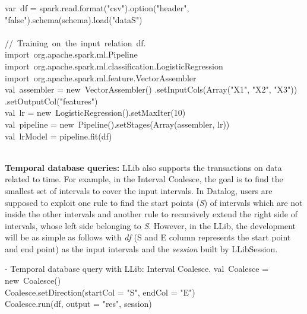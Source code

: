 var\ df = spark.read.format("csv").option("header", "false").schema(schema).load("dataS") \\
\\
//\ Training\ on\ the\ input\ relation\ df. \\
import\ org.apache.spark.ml.Pipeline \\
import\ org.apache.spark.ml.classification.LogisticRegression \\
import\ org.apache.spark.ml.feature.VectorAssembler
\\
val\ assembler = new\ VectorAssembler()
.setInputCols(Array("X1", "X2", "X3"))\\
.setOutputCol("features") \\
val\ lr = new\  LogisticRegression().setMaxIter(10) \\
val\ pipeline = new\ Pipeline().setStages(Array(assembler, lr)) \\
val\ lrModel = pipeline.fit(df) \\
\\

\eldl



\textbf{Temporal database queries:}
LLib also supports the transactions on data related to time. For example, in the Interval Coalesce, the goal is to find the smallest set of intervals to cover the input intervals. In Datalog, users are supposed to exploit one rule to find the start points (\textit{S}) of intervals which are not inside the other intervals and another rule to recursively extend the right side of intervals, whose left side belonging to \textit{S}. However, in the LLib, the development will be as simple as follows with \textit{df} (S and E column represents the start point and end point) as the input intervals and the \textit{session} built by LLibSession.


\vspace{0.5em}
 - Temporal database query with LLib: Interval Coalesce.
\bldl
val\ Coalesce = new\ Coalesce() \\
Coalesce.setDirection(startCol = "S", endCol = "E") \\
Coalesce.run(df, output = "res", session)
\eldl

